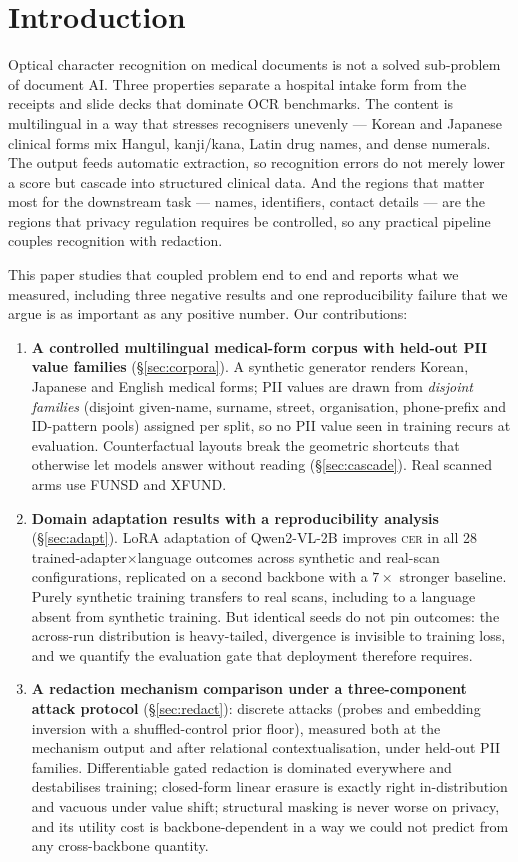 \documentclass[11pt]{article}
\newcommand{\cer}{\textsc{cer}}
\begin{document}
\section{Introduction}\label{sec:intro}

Optical character recognition on medical documents is not a solved
sub-problem of document AI. Three properties separate a hospital intake form
from the receipts and slide decks that dominate OCR benchmarks. The content
is multilingual in a way that stresses recognisers unevenly --- Korean and
Japanese clinical forms mix Hangul, kanji/kana, Latin drug names, and dense
numerals. The output feeds automatic extraction, so recognition errors do
not merely lower a score but cascade into structured clinical data. And the
regions that matter most for the downstream task --- names, identifiers,
contact details --- are the regions that privacy regulation requires be
controlled, so any practical pipeline couples recognition with redaction.

This paper studies that coupled problem end to end and reports what we
measured, including three negative results and one reproducibility failure
that we argue is as important as any positive number. Our contributions:

\begin{enumerate}
\item \textbf{A controlled multilingual medical-form corpus with held-out
PII value families} (\S\ref{sec:corpora}). A synthetic generator renders
Korean, Japanese and English medical forms; PII values are drawn from
\emph{disjoint families} (disjoint given-name, surname, street,
organisation, phone-prefix and ID-pattern pools) assigned per split, so no
PII value seen in training recurs at evaluation. Counterfactual layouts
break the geometric shortcuts that otherwise let models answer without
reading (\S\ref{sec:cascade}). Real scanned arms use FUNSD and XFUND.
\item \textbf{Domain adaptation results with a reproducibility analysis}
(\S\ref{sec:adapt}). LoRA adaptation of Qwen2-VL-2B improves \cer{} in all
28 trained-adapter$\times$language outcomes across synthetic and real-scan
configurations, replicated on a second backbone with a $7\times$ stronger
baseline. Purely synthetic training transfers to real scans, including to a
language absent from synthetic training. But identical seeds do not pin
outcomes: the across-run distribution is heavy-tailed, divergence is
invisible to training loss, and we quantify the evaluation gate that
deployment therefore requires.
\item \textbf{A redaction mechanism comparison under a three-component
attack protocol} (\S\ref{sec:redact}): discrete attacks (probes and
embedding inversion with a shuffled-control prior floor), measured both at
the mechanism output and after relational contextualisation, under held-out
PII families. Differentiable gated redaction is dominated everywhere and
destabilises training; closed-form linear erasure is exactly right
in-distribution and vacuous under value shift; structural masking is never
worse on privacy, and its utility cost is backbone-dependent in a way we
could not predict from any cross-backbone quantity.
\end{enumerate}
\end{document}
